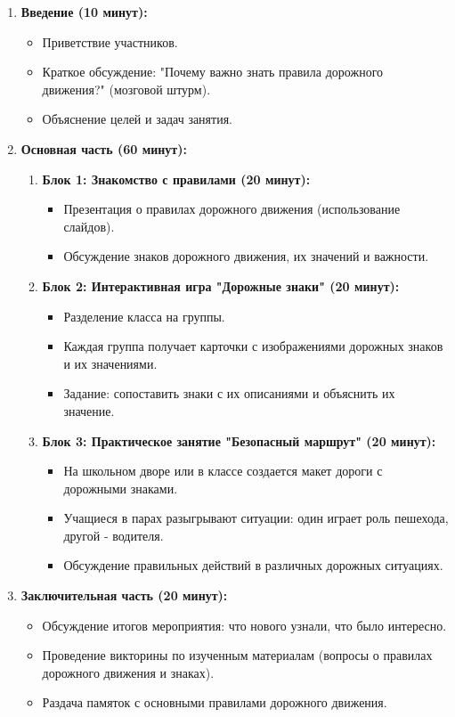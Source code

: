 \documentclass[a4paper,12pt]{article}
\begin{document}
\begin{enumerate}[label=\arabic*]
    \item \textbf{Введение (10 минут):}
    \begin{itemize}
        \item Приветствие участников.
        \item Краткое обсуждение: "Почему важно знать правила дорожного движения?" (мозговой штурм).
        \item Объяснение целей и задач занятия.
    \end{itemize}
    \item \textbf{Основная часть (60 минут):}
    \begin{enumerate}[label=\roman*]
        \item \textbf{Блок 1: Знакомство с правилами (20 минут):}
        \begin{itemize}
            \item Презентация о правилах дорожного движения (использование слайдов).
            \item Обсуждение знаков дорожного движения, их значений и важности.
        \end{itemize}
        \item \textbf{Блок 2: Интерактивная игра "Дорожные знаки" (20 минут):}
        \begin{itemize}
            \item Разделение класса на группы.
            \item Каждая группа получает карточки с изображениями дорожных знаков и их значениями.
            \item Задание: сопоставить знаки с их описаниями и объяснить их значение.
        \end{itemize}
        \item \textbf{Блок 3: Практическое занятие "Безопасный маршрут" (20 минут):}
        \begin{itemize}
            \item На школьном дворе или в классе создается макет дороги с дорожными знаками.
            \item Учащиеся в парах разыгрывают ситуации: один играет роль пешехода, другой - водителя.
            \item Обсуждение правильных действий в различных дорожных ситуациях.
        \end{itemize}
    \end{enumerate}
    \item \textbf{Заключительная часть (20 минут):}
    \begin{itemize}
        \item Обсуждение итогов мероприятия: что нового узнали, что было интересно.
        \item Проведение викторины по изученным материалам (вопросы о правилах дорожного движения и знаках).
        \item Раздача памяток с основными правилами дорожного движения.
    \end{itemize}
\end{enumerate}
\end{document}
